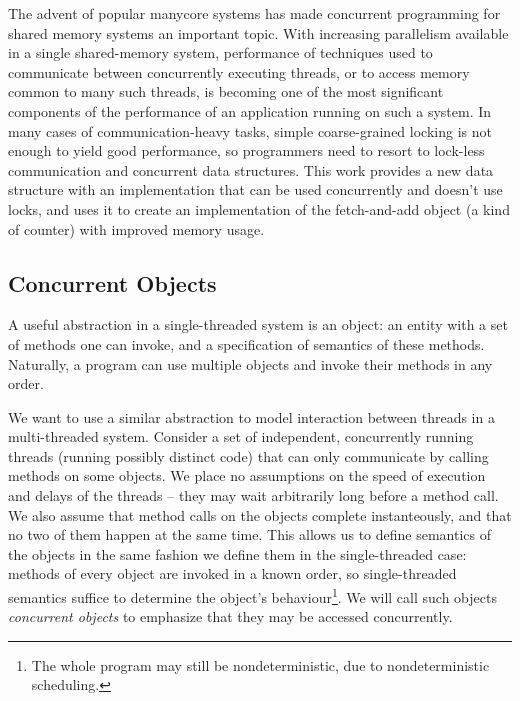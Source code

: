 \documentclass[a4paper,11pt]{article}
\begin{document}
The advent of popular manycore systems has made concurrent programming for shared memory systems an important
topic. With increasing parallelism available in a single shared-memory system, performance of techniques
used to communicate between concurrently executing threads, or to access memory common to many such threads,
is becoming one of the most significant components of the performance of an application running on such a system.
In many cases of communication-heavy tasks, simple coarse-grained locking is not enough to yield good performance,
so programmers need to resort to lock-less communication and concurrent data structures. This work provides a new
data structure with an implementation that can be used concurrently and doesn't use locks, and uses it to create
an implementation of the fetch-and-add object (a kind of counter) with improved memory usage.


\subsection{Concurrent Objects}
A useful abstraction in a single-threaded system is an object: an entity with a set of methods one can invoke,
and a specification of semantics of these methods. Naturally, a program can use multiple objects and invoke
their methods in any order.

We want to use a similar abstraction to model interaction between threads in a multi-threaded system.
Consider a set of independent, concurrently running threads (running possibly
distinct code) that can only communicate by calling methods on some objects. We place no assumptions on
the speed of execution and delays of the threads -- they may wait arbitrarily long before a method call.
We also assume that method calls on the objects complete instanteously, and that no two of them happen at the same time.
This allows us to define semantics of the objects in the same fashion we define them in the single-threaded case:
methods of every object are invoked in a known order, so single-threaded semantics suffice to determine the object's behaviour\footnote{The whole program may still be nondeterministic, due to nondeterministic scheduling.}.
We will call such objects \emph{concurrent objects} to emphasize that they may be accessed concurrently.

\end{document}
